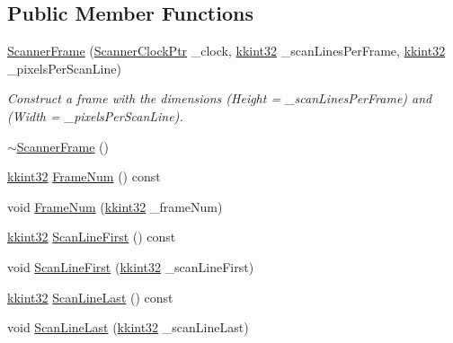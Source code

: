 \subsection*{Public Member Functions}
\begin{DoxyCompactItemize}
\item 
\hyperlink{class_k_k_l_s_c_1_1_scanner_frame_a93862bd55a7532a713f7259743ce44bb}{Scanner\+Frame} (\hyperlink{namespace_k_k_l_s_c_ac5802f7c76843b22e86cabe21b6500e5}{Scanner\+Clock\+Ptr} \+\_\+clock, \hyperlink{namespace_k_k_b_a8fa4952cc84fda1de4bec1fbdd8d5b1b}{kkint32} \+\_\+scan\+Lines\+Per\+Frame, \hyperlink{namespace_k_k_b_a8fa4952cc84fda1de4bec1fbdd8d5b1b}{kkint32} \+\_\+pixels\+Per\+Scan\+Line)
\begin{DoxyCompactList}\small\item\em Construct a frame with the dimensions (Height = \+\_\+scan\+Lines\+Per\+Frame) and (Width = \+\_\+pixels\+Per\+Scan\+Line). \end{DoxyCompactList}\item 
\hyperlink{class_k_k_l_s_c_1_1_scanner_frame_ae7e687d0056c41a7fe39fbce833fb133}{$\sim$\+Scanner\+Frame} ()
\item 
\hyperlink{namespace_k_k_b_a8fa4952cc84fda1de4bec1fbdd8d5b1b}{kkint32} \hyperlink{class_k_k_l_s_c_1_1_scanner_frame_a651eee8c8ee4fdbb4d56a0cce6de58f5}{Frame\+Num} () const 
\item 
void \hyperlink{class_k_k_l_s_c_1_1_scanner_frame_a96ebd9984282145720e0e38cf9abcf3e}{Frame\+Num} (\hyperlink{namespace_k_k_b_a8fa4952cc84fda1de4bec1fbdd8d5b1b}{kkint32} \+\_\+frame\+Num)
\item 
\hyperlink{namespace_k_k_b_a8fa4952cc84fda1de4bec1fbdd8d5b1b}{kkint32} \hyperlink{class_k_k_l_s_c_1_1_scanner_frame_a077b0b7a17f7c0a4eda1baf85712da6e}{Scan\+Line\+First} () const 
\item 
void \hyperlink{class_k_k_l_s_c_1_1_scanner_frame_ae63a207ac015555b145f32f2de28ea06}{Scan\+Line\+First} (\hyperlink{namespace_k_k_b_a8fa4952cc84fda1de4bec1fbdd8d5b1b}{kkint32} \+\_\+scan\+Line\+First)
\item 
\hyperlink{namespace_k_k_b_a8fa4952cc84fda1de4bec1fbdd8d5b1b}{kkint32} \hyperlink{class_k_k_l_s_c_1_1_scanner_frame_a07aee1a2542963869a5b3da11239be45}{Scan\+Line\+Last} () const 
\item 
void \hyperlink{class_k_k_l_s_c_1_1_scanner_frame_a0407c39c438a83a542c30a0ea8a6caf3}{Scan\+Line\+Last} (\hyperlink{namespace_k_k_b_a8fa4952cc84fda1de4bec1fbdd8d5b1b}{kkint32} \+\_\+scan\+Line\+Last)
\item 

\end{DoxyCompactItemize}
